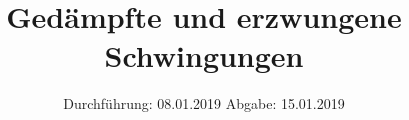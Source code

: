 

\subject{Nr.354}
\title{Gedämpfte und erzwungene Schwingungen}
\date{
  Durchführung: 08.01.2019
  \hspace{3em}
  Abgabe: 15.01.2019
}



\maketitle
\thispagestyle{empty}
\tableofcontents
\newpage






\printbibliography{}


